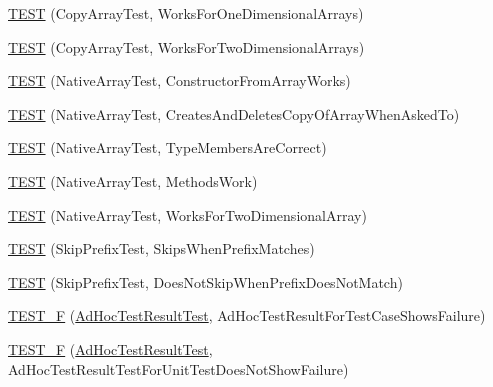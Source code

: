\begin{DoxyCompactItemize}
\item 
\mbox{\hyperlink{_obj__test_2lib_2googletest-release-1_88_81_2googletest_2test_2gtest__unittest_8cc_a0155f940cddc15a77da7df03325c6d1d}{T\+E\+ST}} (Copy\+Array\+Test, Works\+For\+One\+Dimensional\+Arrays)
\item 
\mbox{\hyperlink{_obj__test_2lib_2googletest-release-1_88_81_2googletest_2test_2gtest__unittest_8cc_a1f1a5d3bb2ce15ff081f359e4494a739}{T\+E\+ST}} (Copy\+Array\+Test, Works\+For\+Two\+Dimensional\+Arrays)
\item 
\mbox{\hyperlink{_obj__test_2lib_2googletest-release-1_88_81_2googletest_2test_2gtest__unittest_8cc_acba0839db5cf02cdbd658b9fb810066b}{T\+E\+ST}} (Native\+Array\+Test, Constructor\+From\+Array\+Works)
\item 
\mbox{\hyperlink{_obj__test_2lib_2googletest-release-1_88_81_2googletest_2test_2gtest__unittest_8cc_a227737052f993da5fe2f3294b7f8d184}{T\+E\+ST}} (Native\+Array\+Test, Creates\+And\+Deletes\+Copy\+Of\+Array\+When\+Asked\+To)
\item 
\mbox{\hyperlink{_obj__test_2lib_2googletest-release-1_88_81_2googletest_2test_2gtest__unittest_8cc_a1f2578d4ac6aeb87d0c7c9574f79ed0c}{T\+E\+ST}} (Native\+Array\+Test, Type\+Members\+Are\+Correct)
\item 
\mbox{\hyperlink{_obj__test_2lib_2googletest-release-1_88_81_2googletest_2test_2gtest__unittest_8cc_a5f14e3d45e8edc2d22d4e98e7c1422b9}{T\+E\+ST}} (Native\+Array\+Test, Methods\+Work)
\item 
\mbox{\hyperlink{_obj__test_2lib_2googletest-release-1_88_81_2googletest_2test_2gtest__unittest_8cc_a148c11619d001fac39dae12428534b00}{T\+E\+ST}} (Native\+Array\+Test, Works\+For\+Two\+Dimensional\+Array)
\item 
\mbox{\hyperlink{_obj__test_2lib_2googletest-release-1_88_81_2googletest_2test_2gtest__unittest_8cc_a0c38bd27f49371439ed463c1bb44f444}{T\+E\+ST}} (Skip\+Prefix\+Test, Skips\+When\+Prefix\+Matches)
\item 
\mbox{\hyperlink{_obj__test_2lib_2googletest-release-1_88_81_2googletest_2test_2gtest__unittest_8cc_afeb79bbd7756bbeca262cb79315856a4}{T\+E\+ST}} (Skip\+Prefix\+Test, Does\+Not\+Skip\+When\+Prefix\+Does\+Not\+Match)
\item 
\mbox{\hyperlink{_obj__test_2lib_2googletest-release-1_88_81_2googletest_2test_2gtest__unittest_8cc_a59c4dac406a322984fcf67cf1496082d}{T\+E\+S\+T\+\_\+F}} (\mbox{\hyperlink{class_ad_hoc_test_result_test}{Ad\+Hoc\+Test\+Result\+Test}}, Ad\+Hoc\+Test\+Result\+For\+Test\+Case\+Shows\+Failure)
\item 
\mbox{\hyperlink{_obj__test_2lib_2googletest-release-1_88_81_2googletest_2test_2gtest__unittest_8cc_aa2c9c77ebded668b7830e50f6be238d9}{T\+E\+S\+T\+\_\+F}} (\mbox{\hyperlink{class_ad_hoc_test_result_test}{Ad\+Hoc\+Test\+Result\+Test}}, Ad\+Hoc\+Test\+Result\+Test\+For\+Unit\+Test\+Does\+Not\+Show\+Failure)
\end{DoxyCompactItemize}


